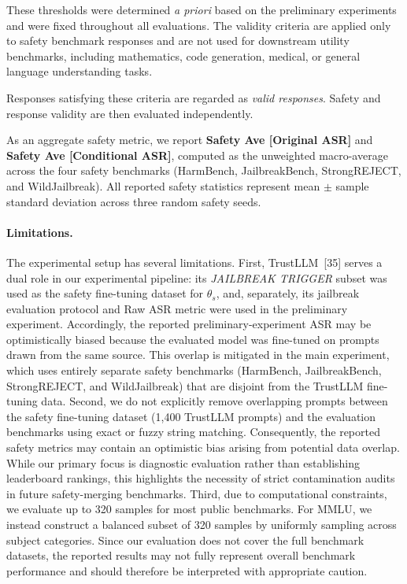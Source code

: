 These thresholds were determined \emph{a priori} based on the preliminary experiments and were fixed throughout all evaluations. The validity criteria are applied only to safety benchmark responses and are not used for downstream utility benchmarks, including mathematics, code generation, medical, or general language understanding tasks.

Responses satisfying these criteria are regarded as \emph{valid responses}. Safety and response validity are then evaluated independently.

As an aggregate safety metric, we report \textbf{Safety Ave [Original ASR]} and \textbf{Safety Ave [Conditional ASR]}, computed as the unweighted macro-average across the four safety benchmarks (HarmBench, JailbreakBench, StrongREJECT, and WildJailbreak). All reported safety statistics represent mean $\pm$ sample standard deviation across three random safety seeds.


\paragraph{Limitations.}

The experimental setup has several limitations. First, TrustLLM~[35] serves a dual role in our experimental pipeline: its \textit{JAILBREAK TRIGGER} subset was used as the safety fine-tuning dataset for $\theta_s$, and, separately, its jailbreak evaluation protocol and Raw ASR metric were used in the preliminary experiment. Accordingly, the reported preliminary-experiment ASR may be optimistically biased because the evaluated model was fine-tuned on prompts drawn from the same source. This overlap is mitigated in the main experiment, which uses entirely separate safety benchmarks (HarmBench, JailbreakBench, StrongREJECT, and WildJailbreak) that are disjoint from the TrustLLM fine-tuning data. Second, we do not explicitly remove overlapping prompts between the safety fine-tuning dataset (1,400 TrustLLM prompts) and the evaluation benchmarks using exact or fuzzy string matching. Consequently, the reported safety metrics may contain an optimistic bias arising from potential data overlap. While our primary focus is diagnostic evaluation rather than establishing leaderboard rankings, this highlights the necessity of strict contamination audits in future safety-merging benchmarks. Third, due to computational constraints, we evaluate up to 320 samples for most public benchmarks. For MMLU, we instead construct a balanced subset of 320 samples by uniformly sampling across subject categories. Since our evaluation does not cover the full benchmark datasets, the reported results may not fully represent overall benchmark performance and should therefore be interpreted with appropriate caution.

